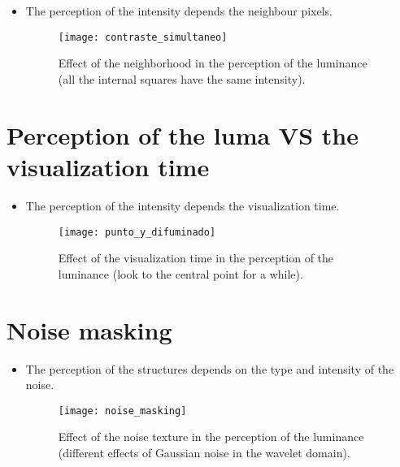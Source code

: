 \section*{}
\begin{itemize}
\item The perception of the intensity depends the neighbour pixels.
\begin{figure}[H]
  \centering
  \texttt{[image: contraste\_simultaneo]}
  \caption[Effect of the neighborhood in the perception of the luminance (2).]{Effect of the neighborhood in the perception of the luminance (all the internal squares have the same intensity).}
  \label{fig:luminance_vs_neighbor_2}
\end{figure}
\end{itemize}

\section{Perception of the luma VS the visualization time}
\begin{itemize}
\item The perception of the intensity depends the visualization time.
\begin{figure}[H]
  \centering
  \texttt{[image: punto\_y\_difuminado]}
  \caption[Effect of visualization time in the perception of the luminance.]{Effect of the visualization time in the perception of the luminance (look to the central point for a while).}
  \label{fig:luminance_vs_visualization_time}
\end{figure}
\end{itemize}

\section{Noise masking}
\begin{itemize}
\item The perception of the structures depends on the type and intensity of the noise.
\begin{figure}[H]
  \centering
  \texttt{[image: noise\_masking]}
  \caption[Noise masking effect.]{Effect of the noise texture in the perception of the luminance (different effects of Gaussian noise in the wavelet domain).}
  \label{fig:noise_masking}
\end{figure}
\end{itemize}
